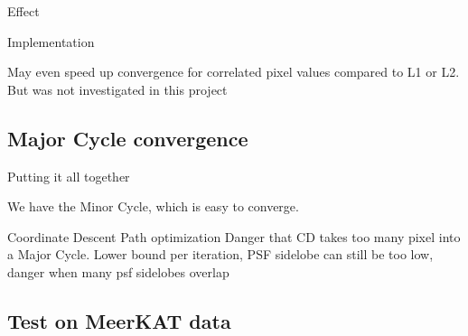 Effect

Implementation



May even speed up convergence for correlated pixel values compared to L1 or L2\cite{friedman2010regularization}. But was not investigated in this project

\subsection{Major Cycle convergence}
Putting it all together

We have the Minor Cycle, which is easy to converge.

Coordinate Descent Path optimization \cite{friedman2010regularization}
Danger that CD takes too many pixel into a Major Cycle. Lower bound per iteration, PSF sidelobe
  can still be too low, danger when many psf sidelobes overlap

\subsection{Test on MeerKAT data}

